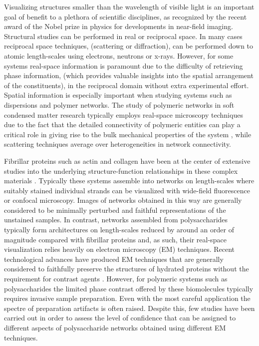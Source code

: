 Visualizing structures smaller than the wavelength of visible light is an important goal of benefit to a plethora of scientific disciplines, as recognized by the recent award of the Nobel prize in physics for developments in near-field imaging. Structural studies can be performed in real or reciprocal space. In many cases reciprocal space techniques, (scattering or diffraction), can be performed down to atomic length-scales using electrons, neutrons or x-rays. However, for some systems real-space information is  paramount due to the difficulty of retrieving phase information, (which provides valuable insights into the spatial arrangement of the constituents), in the reciprocal domain without extra experimental effort. Spatial information is especially important when studying systems such as dispersions and polymer networks. The study of polymeric networks in soft condensed matter research typically employs real-space microscopy techniques due to the fact that the detailed connectivity of polymeric entities can play a critical role in giving rise to the bulk mechanical properties of the system \cite{onck_alternative_2005, lindstrom_finite-strain_2013}, while scattering techniques average over heterogeneities in network connectivity. 


Fibrillar proteins such as actin and collagen have been at the center of extensive studies into the underlying structure-function relationships in these complex materials \cite{broedersz_filament-length-controlled_2012}. Typically these systems assemble into networks on length-scales where suitably stained individual strands can be visualized with wide-field fluorescence or confocal microscopy. Images of networks obtained in this way are generally considered to be minimally perturbed and faithful representations of the unstained samples\cite{magatti_modeling_2013}. In contrast, networks assembled from polysaccharides typically form architectures on length-scales reduced by around an order of magnitude compared with fibrillar proteins and, as such, their real-space visualization relies heavily on electron microscopy (EM) techniques. Recent technological advances have produced  EM techniques that are generally considered to faithfully preserve the structures of hydrated proteins without the requirement for contrast agents \cite{dohnalkova_imaging_2011}. However, for polymeric systems such as polysaccharides the limited phase contrast offered by these biomolecules typically requires invasive sample preparation. Even with the most careful application the spectre of preparation artifacts is often raised. Despite this, few studies have been carried out in order to assess the level of confidence that can be assigned to different aspects of polysaccharide networks obtained using different EM techniques.

